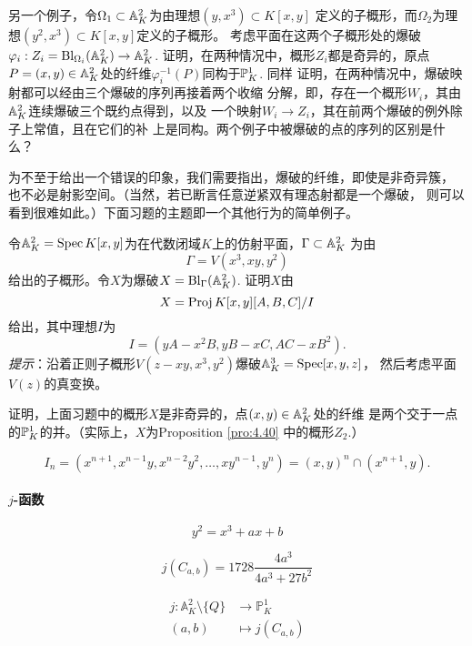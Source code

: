 \begin{exe}\label{exe:4.42}
	另一个例子，令$\Omega_1\subset \A_K^2$为由理想$(y,x^3)\subset K[x,y]$
	定义的子概形，而$\Omega_2$为理想$(y^2,x^3)\subset K[x,y]$定义的子概形。
	考虑平面在这两个子概形处的爆破$\varphi_i:Z_i=\Bl_{\Omega_i}(\A_K^2)
	\to \A_K^2$. 证明，在两种情况中，概形$Z_i$都是奇异的，原点
	$P=(x,y)\in \A_K^2$处的纤维$\varphi_i^{-1}(P)$同构于$\P_K^1$. 同样
	证明，在两种情况中，爆破映射都可以经由三个爆破的序列再接着两个收缩
	分解，即，存在一个概形$W_i$，其由$\A_K^2$连续爆破三个既约点得到，以及
	一个映射$W_i\to Z_i$，其在前两个爆破的例外除子上常值，且在它们的补
	上是同构。两个例子中被爆破的点的序列的区别是什么？
\end{exe}

为不至于给出一个错误的印象，我们需要指出，爆破的纤维，即使是非奇异簇，
也不必是射影空间。（当然，若已断言任意逆紧双有理态射都是一个爆破，
则可以看到很难如此。）下面习题的主题即一个其他行为的简单例子。

\begin{exe}\label{exe:4.43}
令$\A_K^2=\spec K[x,y]$为在代数闭域$K$上的仿射平面，$\Gamma\subset \A_K^2$
为由
\[
	\Gamma=V(x^3,xy,y^2)
\]
给出的子概形。令$X$为爆破$X=\Bl_\Gamma(\A_K^2)$. 证明$X$由
\[
	X=\proj K[x,y][A,B,C]/I
\]
给出，其中理想$I$为
\[
	I=(yA-x^2B,yB-xC,AC-xB^2).
\]
\emph{提示}：沿着正则子概形$V(z-xy,x^3,y^2)$爆破$\A_K^3=\spec [x,y,z]$，
然后考虑平面$V(z)$的真变换。
\end{exe}

\begin{exe}\label{exe:4.44}
	证明，上面习题中的概形$X$是非奇异的，点$(x,y)\in\A_K^2$处的纤维
	是两个交于一点的$\P_K^1$的并。（实际上，$X$为Proposition 
	\ref{pro:4.40} 中的概形$Z_2$.）
\end{exe}

\nottran 


\[
	I_n=(x^{n+1},x^{n-1}y,x^{n-2}y^2,\dots,xy^{n-1},y^n)=
	(x,y)^n\cap (x^{n+1},y).
\]


\paragraph*{$j$-函数}

\[
	y^2=x^3+ax+b
\]

\[
	j(C_{a,b})=1728\frac{4a^3}{4a^3+27b^2}
\]

\[
	\begin{aligned}
		j:\mathbb A_K^2\setminus \{Q\}&\longrightarrow \mathbb P_K^1 \\
		(a,b)&\longmapsto j(C_{a,b})
	\end{aligned}
\]

